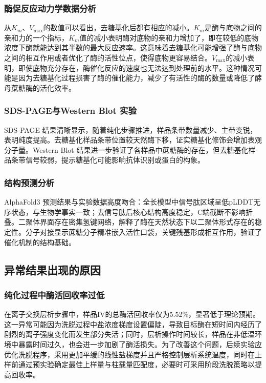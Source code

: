 \documentclass[10.5pt, a4paper]{ctexart}
\begin{document}
\subsubsection{酶促反应动力学数据分析}

从$K_m$、$V_\text{max}$的数值可以看出，去糖基化后都有相应的减小。$K_m$是酶与底物之间的亲和力的一个指标，$K_m$值的减小表明酶对底物的亲和力增加了，即在较低的底物浓度下酶就能达到其半数的最大反应速率。这意味着去糖基化可能增强了酶与底物之间的相互作用或者优化了酶的活性位点，使得底物更容易结合。$V_\text{max}$的减小表明，即使底物充分存在，酶催化反应的速度也无法达到处理前的水平。这种情况可能是因为去糖基化过程损害了酶的催化能力，减少了有活性的酶的数量或降低了酵母蔗糖酶的活化效率。

\subsubsection{SDS-PAGE与Western Blot 实验}
SDS-PAGE 结果清晰显示，随着纯化步骤推进，样品条带数量减少、主带变锐，表明纯度提高。去糖基化样品条带位置较天然酶下移，证实糖基化修饰会增加表观分子量。Western Blot 结果进一步验证了各样品中蔗糖酶的存在，但去糖基化样品条带信号较弱，提示糖基化可能影响抗体识别或蛋白的构象。

\subsubsection{结构预测分析}
AlphaFold3 预测结果与实验数据高度吻合：全长模型中信号肽区域呈低pLDDT无序状态，与生物学事实一致；去信号肽后核心结构高度稳定，C端截断不影响折叠。二聚体界面存在密集氢键网络，解释了酶在天然状态下以二聚体形式存在的稳定性。分子对接显示蔗糖分子精准嵌入活性口袋，关键残基形成相互作用，验证了催化机制的结构基础。

\subsection{异常结果出现的原因}

\subsubsection{纯化过程中酶活回收率过低}
在离子交换层析步骤中，样品IV的总酶活回收率仅为5.52\%，显著低于理论预期。这一异常可能因为洗脱过程中盐浓度梯度设置偏陡，导致目标酶在短时间内经历了剧烈的离子强度变化而发生部分失活；同时，层析操作时间较长，样品在非低温环境中暴露时间过久，也会进一步加剧了酶活损失。为了改善这个问题，后续实验应优化洗脱程序，采用更加平缓的线性盐梯度并且严格控制层析系统温度，同时在上样前通过预实验确定最佳上样量与柱载量匹配度，必要时可采用阶段洗脱策略以提高回收率。
\end{document}
